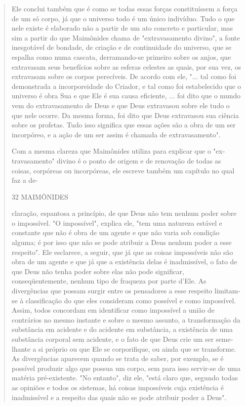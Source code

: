\begin{quote}
Ele conclui também que é como se todas essas forças constituíssem a
força de um só corpo, já que o universo todo é um único indivíduo. Tudo
o que nele existe é elaborado não a partir de um ato concreto e
particular, mas sim a partir do que Maimônides chama de "extravasamento
divino", a fonte inesgotável de bondade, de criação e de continuidade do
universo, que se es­palha como numa cascata, derramando-se primeiro
sobre os anjos, que extra­vasam seus benefícios sobre as esferas
celestes as quais, por sua vez, os extrava­sam sobre os corpos
perecíveis. De acordo com ele, "... tal como foi demons­trada a
incorporeidade do Criador, e tal como foi estabelecido que o universo é
obra Sua e que Ele é sua causa eficiente, ... foi dito que o mundo vem
do extravasamento de Deus e que Deus extravasou sobre ele tudo o que
nele ocorre. Da mesma forma, foi dito que Deus extravasou sua ciência
sobre os profetas. Tudo isso significa que essas ações são a obra de um
ser incorpóreo, e a ação de um ser assim é chamada de extravasamento".

Com a mesma clareza que Maimônides utiliza para explicar que o
"ex­travasamento" divino é o ponto de origem e de renovação de todas as
coisas, corpóreas ou incorpóreas, ele escreve também um capítulo no qual
faz a de-

32 MAIMÔNIDES

claração, espantosa a princípio, de que Deus não tem nenhum poder sobre
o impossível. "O impossível", explica ele, "tem uma natureza estável e
constan­te que não é obra de um agente e que não varia sob condição
alguma; é por isso que não se pode atribuir a Deus nenhum poder a esse
respeito". Ele escla­rece, a seguir, que já que as coisas impossíveis
não são obra de um agente e que já que a existência delas é
inadmissível, o fato de que Deus não tenha po­der sobre elas não pode
significar, conseqüentemente, nenhum tipo de fraque­za por parte d'Ele.
As divergências que possam surgir entre os pensadores a es­se respeito
limitam-se à classificação do que eles consideram como possível e como
impossível. Assim, todos concordam em identificar como impossível a
união de contrários no mesmo instante e sobre o mesmo assunto, a
transfor­mação da substância em acidente e do acidente em substância, a
existência de uma substância corporal sem acidente, e o fato de que Deus
crie um ser seme­lhante a si próprio ou que Ele se corporifique, ou
ainda que se transforme. As divergências aparecem quando se trata de
saber, por exemplo, se é possível pro­duzir algo que possua um corpo,
sem para isso servir-se de uma matéria pré-exis­tente. "No entanto", diz
ele, "está claro que, segundo todas as opiniões e to­dos os sistemas, há
coisas impossíveis cuja existência é inadmissível e a respei­to das
quais não se pode atribuir poder a Deus".


\end{quote}
